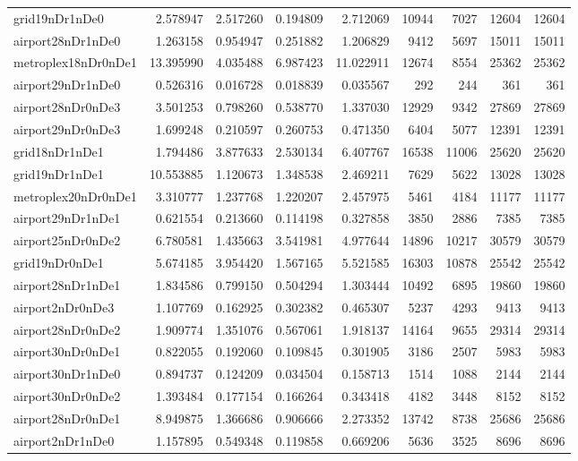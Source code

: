 \begin{longtable}{|l|r|r|r|r|r|r|r|r|}
grid19nDr1nDe0 & 2.578947 & 2.517260 & 0.194809 & 2.712069 & 10944 & 7027 & 12604 & 12604 \\
airport28nDr1nDe0 & 1.263158 & 0.954947 & 0.251882 & 1.206829 & 9412 & 5697 & 15011 & 15011 \\
metroplex18nDr0nDe1 & 13.395990 & 4.035488 & 6.987423 & 11.022911 & 12674 & 8554 & 25362 & 25362 \\
airport29nDr1nDe0 & 0.526316 & 0.016728 & 0.018839 & 0.035567 & 292 & 244 & 361 & 361 \\
airport28nDr0nDe3 & 3.501253 & 0.798260 & 0.538770 & 1.337030 & 12929 & 9342 & 27869 & 27869 \\
airport29nDr0nDe3 & 1.699248 & 0.210597 & 0.260753 & 0.471350 & 6404 & 5077 & 12391 & 12391 \\
grid18nDr1nDe1 & 1.794486 & 3.877633 & 2.530134 & 6.407767 & 16538 & 11006 & 25620 & 25620 \\
grid19nDr1nDe1 & 10.553885 & 1.120673 & 1.348538 & 2.469211 & 7629 & 5622 & 13028 & 13028 \\
metroplex20nDr0nDe1 & 3.310777 & 1.237768 & 1.220207 & 2.457975 & 5461 & 4184 & 11177 & 11177 \\
airport29nDr1nDe1 & 0.621554 & 0.213660 & 0.114198 & 0.327858 & 3850 & 2886 & 7385 & 7385 \\
airport25nDr0nDe2 & 6.780581 & 1.435663 & 3.541981 & 4.977644 & 14896 & 10217 & 30579 & 30579 \\
grid19nDr0nDe1 & 5.674185 & 3.954420 & 1.567165 & 5.521585 & 16303 & 10878 & 25542 & 25542 \\
airport28nDr1nDe1 & 1.834586 & 0.799150 & 0.504294 & 1.303444 & 10492 & 6895 & 19860 & 19860 \\
airport2nDr0nDe3 & 1.107769 & 0.162925 & 0.302382 & 0.465307 & 5237 & 4293 & 9413 & 9413 \\
airport28nDr0nDe2 & 1.909774 & 1.351076 & 0.567061 & 1.918137 & 14164 & 9655 & 29314 & 29314 \\
airport30nDr0nDe1 & 0.822055 & 0.192060 & 0.109845 & 0.301905 & 3186 & 2507 & 5983 & 5983 \\
airport30nDr1nDe0 & 0.894737 & 0.124209 & 0.034504 & 0.158713 & 1514 & 1088 & 2144 & 2144 \\
airport30nDr0nDe2 & 1.393484 & 0.177154 & 0.166264 & 0.343418 & 4182 & 3448 & 8152 & 8152 \\
airport28nDr0nDe1 & 8.949875 & 1.366686 & 0.906666 & 2.273352 & 13742 & 8738 & 25686 & 25686 \\
airport2nDr1nDe0 & 1.157895 & 0.549348 & 0.119858 & 0.669206 & 5636 & 3525 & 8696 & 8696 \\

\end{longtable}
